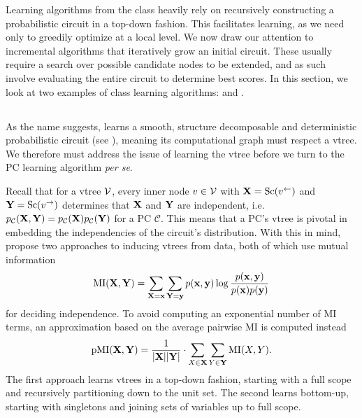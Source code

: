 Learning algorithms from the \divclass{} class heavily rely on recursively constructing a
probabilistic circuit in a top-down fashion. This facilitates learning, as we need only to greedily
optimize at a local level. We now draw our attention to incremental algorithms that iteratively
grow an initial circuit. These usually require a search over possible candidate nodes to be
extended, and as such involve evaluating the entire circuit to determine best scores. In this
section, we look at two examples of \incrclass{} class learning algorithms: 
and .

\subsection{}
\label{subsection:learnpsdd}

As the name suggests,  \citep{liang17} learns a smooth, structure decomposable
and deterministic probabilistic circuit (see ), meaning its
computational graph must respect a vtree. We therefore must address the issue of learning the vtree
before we turn to the PC learning algorithm \emph{per se}.

Recall that for a vtree $\operatorname{\mathcal{V}}$, every inner node $v\in\operatorname{\mathcal{V}}$ with $\mathbf{X}=\operatorname*{\normalfont{Sc}}(v^\gets)$ and
$\mathbf{Y}=\operatorname*{\normalfont{Sc}}(v^\to)$ determines that $\mathbf{X}$ and $\mathbf{Y}$ are independent, i.e.\
$p_\mathcal{C}(\mathbf{X},\mathbf{Y})=p_\mathcal{C}(\mathbf{X}) p_\mathcal{C}(\mathbf{Y})$ for a PC
$\mathcal{C}$. This means that a PC's vtree is pivotal in embedding the independencies of the
circuit's distribution. With this in mind, \citet{liang17} propose two approaches to inducing
vtrees from data, both of which use mutual information
\begin{equation*}
  \operatorname{\normalfont{MI}}(\mathbf{X},\mathbf{Y})=\sum_{\mathbf{X}=\mathbf{x}}\sum_{\mathbf{Y}=\mathbf{y}}p(\mathbf{x},\mathbf{y})\log\frac{p(\mathbf{x},\mathbf{y})}{p(\mathbf{x})p(\mathbf{y})}
\end{equation*}
for deciding independence. To avoid computing an exponential number of MI terms, an approximation
based on the average pairwise MI is computed instead
\begin{equation*}
  \operatorname{\normalfont{pMI}}(\mathbf{X},\mathbf{Y})=\frac{1}{|\mathbf{X}||\mathbf{Y}|}\cdot\sum_{X\in\mathbf{X}}\sum_{Y\in\mathbf{Y}}\operatorname{\normalfont{MI}}(X,Y).
\end{equation*}
The first approach learns vtrees in a top-down fashion, starting with a full scope and recursively
partitioning down to the unit set. The second learns bottom-up, starting with singletons and
joining sets of variables up to full scope.

